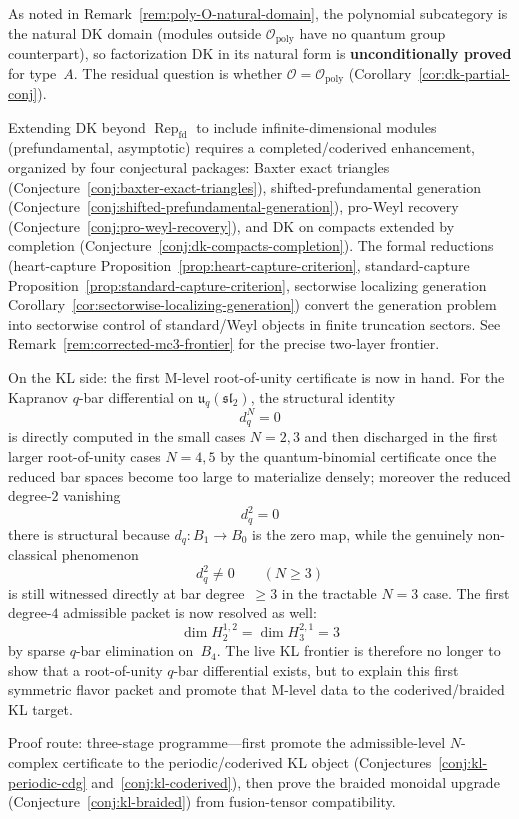 \begin{remark}
As noted in Remark~\ref{rem:poly-O-natural-domain}, the polynomial
subcategory is the natural DK domain (modules outside
$\mathcal{O}_{\mathrm{poly}}$ have no quantum group counterpart),
so factorization DK in its natural form is
\textbf{unconditionally proved} for type~$A$.
The residual question is whether $\mathcal{O} = \mathcal{O}_{\mathrm{poly}}$
(Corollary~\ref{cor:dk-partial-conj}).

Extending DK beyond $\operatorname{Rep}_{\mathrm{fd}}$ to include
infinite-dimensional modules (prefundamental, asymptotic) requires a
completed/coderived enhancement, organized by four conjectural packages:
Baxter exact triangles
(Conjecture~\ref{conj:baxter-exact-triangles}),
shifted-prefundamental generation
(Conjecture~\ref{conj:shifted-prefundamental-generation}),
pro-Weyl recovery
(Conjecture~\ref{conj:pro-weyl-recovery}), and
DK on compacts extended by completion
(Conjecture~\ref{conj:dk-compacts-completion}).
The formal reductions (heart-capture
Proposition~\ref{prop:heart-capture-criterion}, standard-capture
Proposition~\ref{prop:standard-capture-criterion}, sectorwise
localizing generation
Corollary~\ref{cor:sectorwise-localizing-generation}) convert
the generation problem into sectorwise control of standard/Weyl
objects in finite truncation sectors.
See Remark~\ref{rem:corrected-mc3-frontier} for the precise
two-layer frontier.

On the KL side: the first M-level root-of-unity certificate is now in
hand.  For the Kapranov $q$-bar differential on
$\mathfrak{u}_q(\mathfrak{sl}_2)$, the structural identity
\[
d_q^N=0
\]
is directly computed in the small cases $N=2,3$ and then discharged in
the first larger root-of-unity cases $N=4,5$ by the quantum-binomial
certificate once the reduced bar spaces become too large to materialize
densely; moreover the reduced degree-$2$ vanishing
\[
d_q^2=0
\]
there is structural because
$d_q\colon B_1\to B_0$ is the zero map, while the genuinely
non-classical phenomenon
\[
d_q^2\neq 0
\qquad (N\ge 3)
\]
is still witnessed directly at bar degree~$\ge 3$ in the tractable
$N=3$ case.  The first degree-$4$ admissible packet is now resolved as
well:
\[
\dim H^{1,2}_2
=
\dim H^{2,1}_3
=
3
\]
by sparse $q$-bar elimination on~$B_4$.  The live KL frontier is
therefore no longer to show that a root-of-unity $q$-bar differential
exists, but to explain this first symmetric flavor packet and promote
that M-level data to the coderived/braided KL target.

Proof route: three-stage programme---first promote the admissible-level
$N$-complex certificate to the periodic/coderived KL object
\textup{(}Conjectures~\ref{conj:kl-periodic-cdg}
and~\ref{conj:kl-coderived}\textup{)}, then prove the braided monoidal
upgrade \textup{(}Conjecture~\ref{conj:kl-braided}\textup{)} from
fusion-tensor compatibility.


\end{remark}
